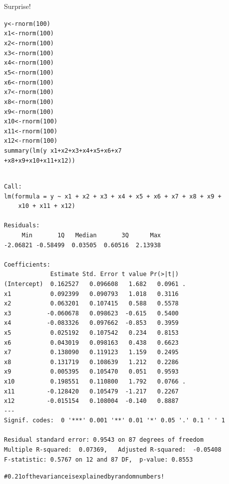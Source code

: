 \documentclass{beamer}\usepackage[]{graphicx}\usepackage[]{color}
\makeatletter
\newcommand{\hlnum}[1]{\textcolor[rgb]{0.824,0.412,0.118}{#1}}%
\newcommand{\hlcom}[1]{\textcolor[rgb]{0.824,0.706,0.549}{#1}}%
\newcommand{\hlopt}[1]{\textcolor[rgb]{1,0.894,0.769}{#1}}%
\newcommand{\hlstd}[1]{\textcolor[rgb]{1,0.894,0.769}{#1}}%
\newcommand{\hlkwb}[1]{\textcolor[rgb]{0.804,0.776,0.451}{#1}}%
\newcommand{\hlkwd}[1]{\textcolor[rgb]{1,0.78,0.769}{#1}}%
\newenvironment{kframe}{%
 \def\at@end@of@kframe{}%
 \ifinner\ifhmode%
  \def\at@end@of@kframe{\end{minipage}}%
  \begin{minipage}{\columnwidth}%
 \fi\fi%
 \def\FrameCommand##1{\hskip\@totalleftmargin \hskip-\fboxsep
 \colorbox{shadecolor}{##1}\hskip-\fboxsep
     \hskip-\linewidth \hskip-\@totalleftmargin \hskip\columnwidth}%
 \MakeFramed {\advance\hsize-\width
   \@totalleftmargin\z@ \linewidth\hsize
   \@setminipage}}%
 {\par\unskip\endMakeFramed%
 \at@end@of@kframe}
\newenvironment{knitrout}{}{} %
\makeatother
\begin{document}
\begin{darkframes}
\begin{frame}[fragile]{Surprise!}
\begin{knitrout}
\begin{kframe}
\begin{alltt}
 \hlstd{y} \hlkwb{<-} \hlkwd{rnorm}\hlstd{(}\hlnum{100}\hlstd{)}
 \hlstd{x1} \hlkwb{<-} \hlkwd{rnorm}\hlstd{(}\hlnum{100}\hlstd{)}
 \hlstd{x2} \hlkwb{<-} \hlkwd{rnorm}\hlstd{(}\hlnum{100}\hlstd{)}
 \hlstd{x3} \hlkwb{<-} \hlkwd{rnorm}\hlstd{(}\hlnum{100}\hlstd{)}
 \hlstd{x4} \hlkwb{<-} \hlkwd{rnorm}\hlstd{(}\hlnum{100}\hlstd{)}
 \hlstd{x5} \hlkwb{<-} \hlkwd{rnorm}\hlstd{(}\hlnum{100}\hlstd{)}
 \hlstd{x6} \hlkwb{<-} \hlkwd{rnorm}\hlstd{(}\hlnum{100}\hlstd{)}
 \hlstd{x7} \hlkwb{<-} \hlkwd{rnorm}\hlstd{(}\hlnum{100}\hlstd{)}
 \hlstd{x8} \hlkwb{<-} \hlkwd{rnorm}\hlstd{(}\hlnum{100}\hlstd{)}
 \hlstd{x9} \hlkwb{<-} \hlkwd{rnorm}\hlstd{(}\hlnum{100}\hlstd{)}
 \hlstd{x10} \hlkwb{<-} \hlkwd{rnorm}\hlstd{(}\hlnum{100}\hlstd{)}
 \hlstd{x11} \hlkwb{<-} \hlkwd{rnorm}\hlstd{(}\hlnum{100}\hlstd{)}
 \hlstd{x12} \hlkwb{<-} \hlkwd{rnorm}\hlstd{(}\hlnum{100}\hlstd{)}
 \hlkwd{summary}\hlstd{(}\hlkwd{lm}\hlstd{(y} \hlopt{~} \hlstd{x1} \hlopt{+} \hlstd{x2} \hlopt{+} \hlstd{x3} \hlopt{+} \hlstd{x4} \hlopt{+} \hlstd{x5} \hlopt{+} \hlstd{x6} \hlopt{+} \hlstd{x7}
 \hlopt{+} \hlstd{x8} \hlopt{+} \hlstd{x9} \hlopt{+} \hlstd{x10} \hlopt{+} \hlstd{x11} \hlopt{+} \hlstd{x12))}
\end{alltt}
\begin{verbatim}

Call:
lm(formula = y ~ x1 + x2 + x3 + x4 + x5 + x6 + x7 + x8 + x9 + 
    x10 + x11 + x12)

Residuals:
     Min       1Q   Median       3Q      Max 
-2.06821 -0.58499  0.03505  0.60516  2.13938 

Coefficients:
             Estimate Std. Error t value Pr(>|t|)  
(Intercept)  0.162527   0.096608   1.682   0.0961 .
x1           0.092399   0.090793   1.018   0.3116  
x2           0.063201   0.107415   0.588   0.5578  
x3          -0.060678   0.098623  -0.615   0.5400  
x4          -0.083326   0.097662  -0.853   0.3959  
x5           0.025192   0.107542   0.234   0.8153  
x6           0.043019   0.098163   0.438   0.6623  
x7           0.138090   0.119123   1.159   0.2495  
x8           0.131719   0.108639   1.212   0.2286  
x9           0.005395   0.105470   0.051   0.9593  
x10          0.198551   0.110800   1.792   0.0766 .
x11         -0.128420   0.105479  -1.217   0.2267  
x12         -0.015154   0.108004  -0.140   0.8887  
---
Signif. codes:  0 '***' 0.001 '**' 0.01 '*' 0.05 '.' 0.1 ' ' 1

Residual standard error: 0.9543 on 87 degrees of freedom
Multiple R-squared:  0.07369,	Adjusted R-squared:  -0.05408 
F-statistic: 0.5767 on 12 and 87 DF,  p-value: 0.8553
\end{verbatim}
\begin{alltt}
    \hlcom{# 0.21 of the variance is explained by random numbers!   }
\end{alltt}
\end{kframe}
\end{knitrout}


\end{frame}
\end{darkframes}
\end{document}
